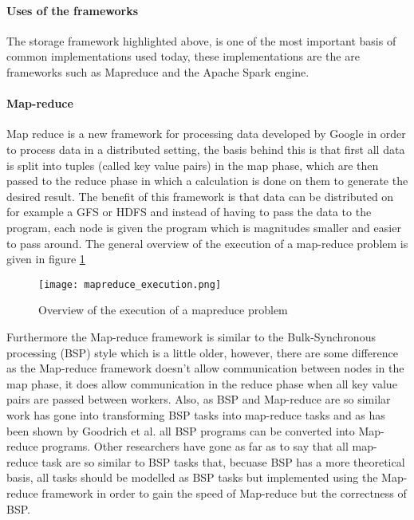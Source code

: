 \paragraph{Uses of the frameworks}
The storage framework highlighted above, is one of the most important basis of common implementations used today,
these implementations are the are frameworks such as Mapreduce and the Apache Spark engine.

\paragraph{Map-reduce}
Map reduce is a new framework for processing data developed by Google\cite{Dean04} in order
to process data in a distributed setting, the basis behind this is that first all
data is split into tuples (called key value pairs) in the map phase, which are then passed to the reduce
phase in which a calculation is done on them to generate the desired result. The
benefit of this framework is that data can be distributed on for example a GFS or HDFS
and instead of having to pass the data to the program, each node is given the program
which is magnitudes smaller and easier to pass around. The general overview of
the execution of a map-reduce problem is given in figure \ref{mapreduce_execution}

\begin{figure}
  \texttt{[image: mapreduce\_execution.png]}
  \caption{Overview of the execution of a mapreduce problem\cite{Dean04}}
  \label{mapreduce_execution}
\end{figure}

Furthermore the Map-reduce framework is similar to the Bulk-Synchronous processing (BSP)
style which is a little older, however, there are some difference as the Map-reduce
framework doesn't allow communication between nodes in the map phase, it does allow
communication in the reduce phase when all key value pairs are passed between workers\cite{Pace12}.
Also, as BSP and Map-reduce are so similar work has gone into transforming BSP tasks into
map-reduce tasks and as has been shown by Goodrich et al.\cite{Goo11} all BSP programs can be
converted into Map-reduce programs. Other researchers have gone as far as to say
that all map-reduce task are so similar to BSP tasks that, becuase BSP has a more theoretical
basis, all tasks should be modelled as BSP tasks but implemented using the Map-reduce framework
in order to gain the speed of Map-reduce but the correctness of BSP\cite{Pace12}.

